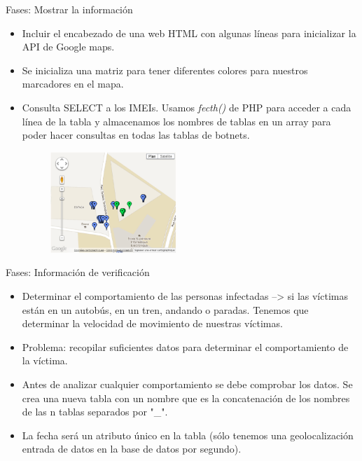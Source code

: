 \documentclass[aspectratio=43]{beamer}
\begin{document}
\begin{frame}{Fases: Mostrar la información}

\begin{itemize}

\item Incluir el encabezado de una web HTML con algunas líneas para inicializar la API de Google maps.

\item Se inicializa una matriz para tener diferentes colores para nuestros marcadores en el mapa.

\item Consulta SELECT a los IMEIs. Usamos \emph{fecth()} de PHP para acceder a cada línea de la tabla y almacenamos los nombres de tablas en un array para poder hacer consultas en todas las tablas de botnets.


	\begin{figure}[htbp] 
	\begin{flushright} 
   \includegraphics[width=0.45\textwidth]{figuras/maps}  
  \label{maps}
  \end{flushright}
\end{figure}


\end{itemize}
  
\end{frame}

\begin{frame}{Fases: Información de verificación}

\begin{itemize}
\item Determinar el comportamiento de las personas infectadas --> si las víctimas están en un autobús, en un tren, andando o paradas. Tenemos que determinar la velocidad de movimiento de nuestras víctimas.

\item Problema: recopilar suficientes datos para determinar el comportamiento de la víctima.

\item Antes de analizar cualquier comportamiento se debe comprobar los datos. Se crea una nueva tabla con un nombre que es la concatenación de los nombres de las n tablas separados por "\_". 

\item La fecha será un atributo único en la tabla (sólo tenemos una geolocalización entrada de datos en la base de datos por segundo).


\end{itemize}
  
\end{frame}
\end{document}
